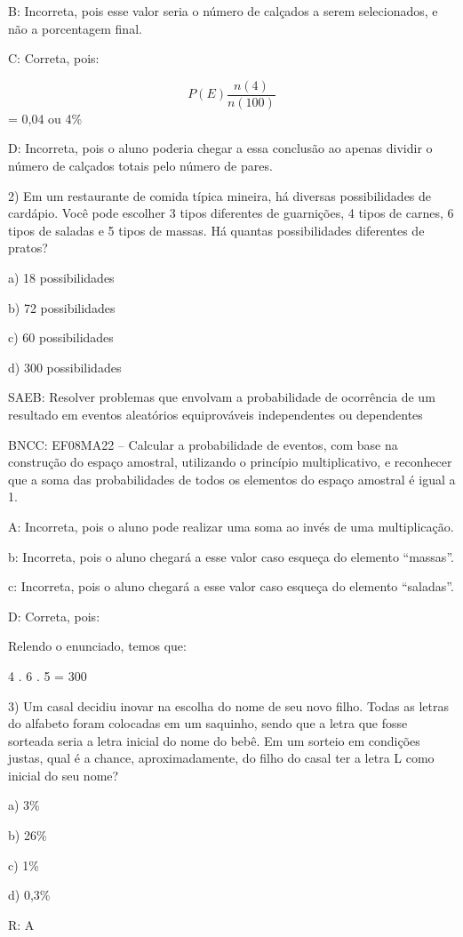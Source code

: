 B: Incorreta, pois esse valor seria o número de calçados a serem
selecionados, e não a porcentagem final.

C: Correta, pois:

\[P(E)\frac{n(4)}{n(100)}\] = 0,04 ou 4\%

D: Incorreta, pois o aluno poderia chegar a essa conclusão ao apenas
dividir o número de calçados totais pelo número de pares.

2) Em um restaurante de comida típica mineira, há diversas
possibilidades de cardápio. Você pode escolher 3 tipos diferentes de
guarnições, 4 tipos de carnes, 6 tipos de saladas e 5 tipos de massas.
Há quantas possibilidades diferentes de pratos?

a) 18 possibilidades

b) 72 possibilidades

c) 60 possibilidades

d) 300 possibilidades

SAEB: Resolver problemas que envolvam a probabilidade de ocorrência de
um resultado em eventos aleatórios equiprováveis independentes ou
dependentes

BNCC: EF08MA22 -- Calcular a probabilidade de eventos, com base na
construção do espaço amostral, utilizando o princípio multiplicativo, e
reconhecer que a soma das probabilidades de todos os elementos do espaço
amostral é igual a 1.

A: Incorreta, pois o aluno pode realizar uma soma ao invés de uma
multiplicação.

b: Incorreta, pois o aluno chegará a esse valor caso esqueça do elemento
``massas''.

c: Incorreta, pois o aluno chegará a esse valor caso esqueça do elemento
``saladas''.

D: Correta, pois:

Relendo o enunciado, temos que:

4 . 6 . 5 = 300

3) Um casal decidiu inovar na escolha do nome de seu novo filho. Todas
as letras do alfabeto foram colocadas em um saquinho, sendo que a letra
que fosse sorteada seria a letra inicial do nome do bebê. Em um sorteio
em condições justas, qual é a chance, aproximadamente, do filho do casal
ter a letra L como inicial do seu nome?

a) 3\%

b) 26\%

c) 1\%

d) 0,3\%

R: A


